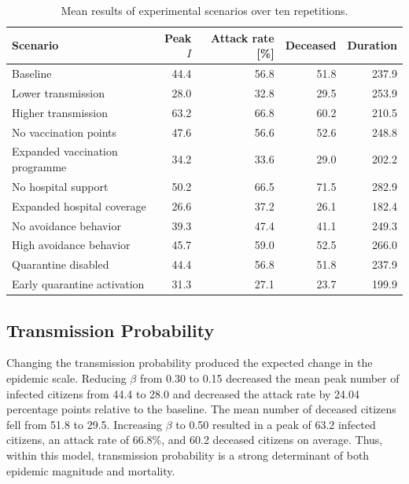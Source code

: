 \documentclass[english]{projectreport}
\begin{document}
\begin{table}[htbp]
  \centering
  \caption{Mean results of experimental scenarios over ten repetitions.}
  \label{tab:scenario-results}
  \small
  \begin{tabularx}{\textwidth}{@{}Xrrrr@{}}
    \toprule
    Scenario & Peak $I$ & Attack rate [\%] & Deceased & Duration \\
    \midrule
    Baseline                         & 44.4 & 56.8 & 51.8 & 237.9 \\
    Lower transmission               & 28.0 & 32.8 & 29.5 & 253.9 \\
    Higher transmission              & 63.2 & 66.8 & 60.2 & 210.5 \\
    No vaccination points            & 47.6 & 56.6 & 52.6 & 248.8 \\
    Expanded vaccination programme   & 34.2 & 33.6 & 29.0 & 202.2 \\
    No hospital support              & 50.2 & 66.5 & 71.5 & 282.9 \\
    Expanded hospital coverage       & 26.6 & 37.2 & 26.1 & 182.4 \\
    No avoidance behavior            & 39.3 & 47.4 & 41.1 & 249.3 \\
    High avoidance behavior          & 45.7 & 59.0 & 52.5 & 266.0 \\
    Quarantine disabled              & 44.4 & 56.8 & 51.8 & 237.9 \\
    Early quarantine activation      & 31.3 & 27.1 & 23.7 & 199.9 \\
    \bottomrule
  \end{tabularx}
\end{table}

\subsection{Transmission Probability}
\label{sec:experiments-transmission}

Changing the transmission probability produced the expected change in
the epidemic scale. Reducing $\beta$ from 0.30 to 0.15 decreased the
mean peak number of infected citizens from 44.4 to 28.0 and decreased
the attack rate by 24.04 percentage points relative to the baseline.
The mean number of deceased citizens fell from 51.8 to 29.5. Increasing
$\beta$ to 0.50 resulted in a peak of 63.2 infected citizens, an attack
rate of 66.8\%, and 60.2 deceased citizens on average. Thus, within
this model, transmission probability is a strong determinant of both
epidemic magnitude and mortality.
\end{document}
